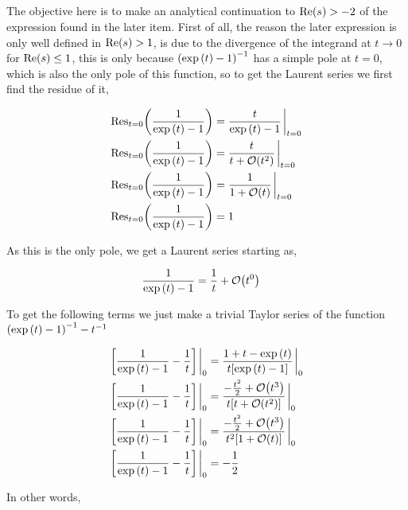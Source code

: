 \subsection{}

The objective here is to make an analytical continuation to $\textnormal{Re}\qty(s)>-2$ of the expression found in the later item. 
First of all, the reason the later expression is only well defined in $\textnormal{Re}\qty(s)>1$, is due to the divergence of the 
integrand at $t\rightarrow 0$ for $\textnormal{Re}\qty(s)\leq1$, this is only because $\qty(\exp\qty(t)-1)^{-1}$ has a simple pole at $t=0$, which 
is also the only pole of this function, so to get the Laurent series we first find the residue of it,

\begin{align*}
    \textnormal{Res}_{t=0}\qty(\frac{1}{\exp\qty(t)-1})&=\frac{t}{\exp\qty(t)-1}\eval_{t=0}\\
    \textnormal{Res}_{t=0}\qty(\frac{1}{\exp\qty(t)-1})&=\frac{t}{t+\mathcal O\qty(t^2)}\eval_{t=0}\\
    \textnormal{Res}_{t=0}\qty(\frac{1}{\exp\qty(t)-1})&=\frac{1}{1+\mathcal O\qty(t)}\eval_{t=0}\\
    \textnormal{Res}_{t=0}\qty(\frac{1}{\exp\qty(t)-1})&=1
\end{align*}

As this is the only pole, we get a Laurent series starting as,

\begin{align*}
    \frac{1}{\exp\qty(t)-1}&=\frac1t+\mathcal O\qty(t^0)
\end{align*}

To get the following terms we just make a trivial Taylor series of the function $\qty(\exp\qty(t)-1)^{-1}-t^{-1}$

\begin{align*}
    \qty[\frac{1}{\exp\qty(t)-1}-\frac1t]\eval_0&=\frac{1+t-\exp\qty(t)}{t\qty[\exp\qty(t)-1]}\eval_0\\
    \qty[\frac{1}{\exp\qty(t)-1}-\frac1t]\eval_0&=\frac{-\frac{t^2}{2}+\mathcal O\qty(t^3)}{t\qty[t+\mathcal O\qty(t^2)]}\eval_0\\
    \qty[\frac{1}{\exp\qty(t)-1}-\frac1t]\eval_0&=\frac{-\frac{t^2}{2}+\mathcal O\qty(t^3)}{t^2\qty[1+\mathcal O\qty(t)]}\eval_0\\
    \qty[\frac{1}{\exp\qty(t)-1}-\frac1t]\eval_0&=-\frac12
\end{align*}

In other words,

